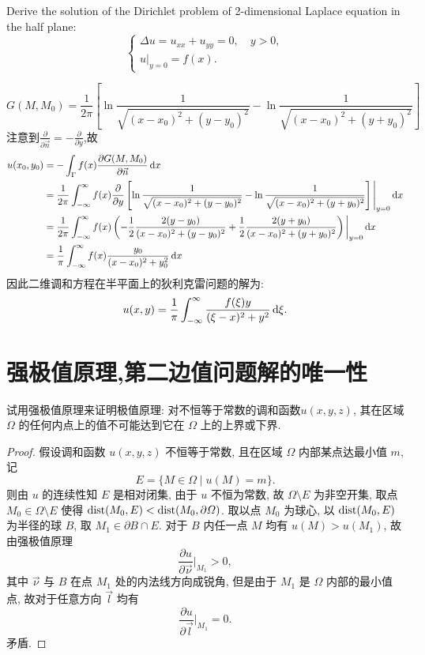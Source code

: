 \begin{exercise}
  Derive the solution of the Dirichlet problem of 2-dimensional Laplace
  equation in the half plane:
  \[\begin{cases}
    \Delta u = u_{xx} + u_{yy} = 0, \quad y>0, \\
    u|_{y=0} = f(x).
  \end{cases}\]
\end{exercise}

\begin{solve}
  \[G(M,M_0)=\frac{1}{2\pi}\left[\ln\frac{1}{\sqrt{(x-x_0)^2+(y-y_0)^2}}-\ln\frac{1}{\sqrt{(x-x_0)^2+(y+y_0)^2}}\right]\]
  注意到$\frac{\partial}{\partial\vec{n}}=-\frac{\partial}{\partial y}$,故
  \[\begin{split}
  u(x_0,y_0)&=-\int_{\Gamma}f(x)\frac{\partial G(M,M_0)}{\partial\vec{n}}\mathop{}\!\mathrm{d} x\\
  &=\frac{1}{2\pi}\int_{-\infty}^{\infty}f(x)\frac{\partial}{\partial y}\left[\ln\frac{1}{\sqrt{(x-x_0)^2+(y-y_0)^2}}-\ln\frac{1}{\sqrt{(x-x_0)^2+(y+y_0)^2}}\right]\Bigg|_{y=0}\mathop{}\!\mathrm{d} x\\
  &=\frac{1}{2\pi}\int_{-\infty}^{\infty}f(x)\left(-\frac{1}{2}\frac{2(y-y_0)}{(x-x_0)^2+(y-y_0)^2}+\frac{1}{2}\frac{2(y+y_0)}{(x-x_0)^2+(y+y_0)^2}\right)\bigg|_{y=0}\mathop{}\!\mathrm{d} x\\
  &=\frac{1}{\pi}\int_{-\infty}^{\infty}f(x)\frac{y_0}{(x-x_0)^2+y_0^2}\mathop{}\!\mathrm{d} x
  \end{split}\]
  因此二维调和方程在半平面上的狄利克雷问题的解为:
  \[u(x,y)=\frac{1}{\pi}\int_{-\infty}^{\infty}\frac{f(\xi)y}{(\xi-x)^2+y^2}\mathop{}\!\mathrm{d}\xi. \qedhere\]
\end{solve}


\section{强极值原理,第二边值问题解的唯一性}

\begin{exercise}
  试用强极值原理来证明极值原理: 对不恒等于常数的调和函数$u(x,y,z)$,
  其在区域 $\varOmega$ 的任何内点上的值不可能达到它在 $\varOmega$ 上的上界或下界.
\end{exercise}

\begin{proof}
  假设调和函数 $u(x,y,z)$ 不恒等于常数, 且在区域 $\varOmega$ 内部某点达最小值 $m$, 记
  \[E = \{ M\in\varOmega \mid u(M) = m\}.\]
  则由 $u$ 的连续性知 $E$ 是相对闭集, 由于 $u$ 不恒为常数, 故 $\varOmega\setminus E$ 为非空开集,
  取点 $M_0\in\varOmega\setminus E$ 使得 $\operatorname{dist}(M_0, E) < \operatorname{dist}(M_0, \partial\varOmega)$.
  取以点 $M_0$ 为球心, 以 $\operatorname{dist}(M_0, E)$ 为半径的球 $B$, 取 $M_1\in \partial B\cap E$.
  对于 $B$ 内任一点 $M$ 均有 $u(M)>u(M_1)$, 故由强极值原理
  \[\frac{\partial u}{\partial\vec{\nu}}\bigg|_{M_1} > 0,\]
  其中 $\vec{\nu}$ 与 $B$ 在点 $M_1$ 处的内法线方向成锐角,
  但是由于 $M_1$ 是 $\varOmega$ 内部的最小值点, 故对于任意方向 $\vec{l}$ 均有
  \[\frac{\partial u}{\partial\vec{l}}\bigg|_{M_1} = 0.\]
  矛盾.
\end{proof}


